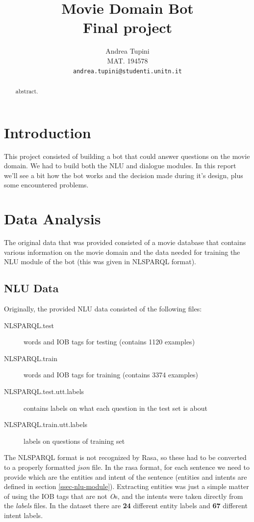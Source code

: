 \documentclass[11pt,a4paper]{article}
\title{Movie Domain Bot \\ Final project}
\author{Andrea Tupini \\
  MAT.  194578 \\
  {\tt andrea.tupini@studenti.unitn.it}}
\date{}
\begin{document}
	
\maketitle

\begin{abstract}
	
	abstract. 
	\\
	
\end{abstract} 

\section{Introduction}

	This project consisted of building a bot that could answer questions on the movie domain. We had to build both the NLU and dialogue modules. In this report we'll see a bit how the bot works and the decision made during it's design, plus some encountered problems.
	
\section{Data Analysis}
\label{sec-data-analysis}
	
	The original data that was provided consisted of a movie database that contains various information on the movie domain and the data needed for training the NLU module of the bot (this was given in NLSPARQL format).
	
	\subsection{NLU Data}
	\label{ssec-nlu-data}
	
		Originally, the provided NLU data consisted of the following files: 
		
		\begin{description}
			\item[NLSPARQL.test] words and IOB tags for testing (contains 1120 examples)
			\item[NLSPARQL.train] words and IOB tags for training (contains 3374 examples)
			\item[NLSPARQL.test.utt.labels] contains labels on what each question in the test set is about              
			\item[NLSPARQL.train.utt.labels] labels on questions of training set
		\end{description}
	
		The NLSPARQL format is not recognized by Rasa, so these had to be converted to a properly formatted \textit{json} file. In the rasa format, for each sentence we need to provide which are the entities and intent of the sentence (entities and intents are defined in section \ref{ssec-nlu-module}). Extracting entities was just a simple matter of using the IOB tags that are not \textit{O}s, and the intents were taken directly from the \textit{labels} files. In the dataset there are \textbf{24} different entity labels and \textbf{67} different intent labels.
		
\end{document}
